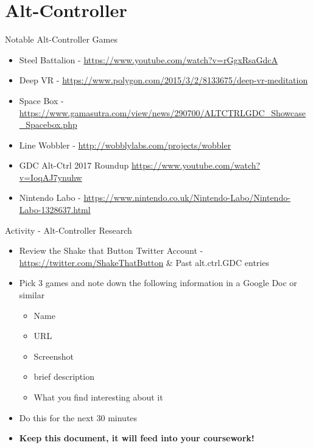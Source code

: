 \part{Alt-Controller}
\frame{\partpage}

\begin{frame}{Notable Alt-Controller Games}
\begin{itemize}
	\item Steel Battalion - \url{https://www.youtube.com/watch?v=rGgxRsaGdcA}
	\item Deep VR - \url{https://www.polygon.com/2015/3/2/8133675/deep-vr-meditation}
	\item Space Box - \url{https://www.gamasutra.com/view/news/290700/ALTCTRLGDC_Showcase_Spacebox.php}
	\item Line Wobbler - \url{http://wobblylabs.com/projects/wobbler}
	\item GDC Alt-Ctrl 2017 Roundup \url{https://www.youtube.com/watch?v=IoqAJ7ynuhw}
	\item Nintendo Labo - \url{https://www.nintendo.co.uk/Nintendo-Labo/Nintendo-Labo-1328637.html}
\end{itemize}
\end{frame}

\begin{frame}{Activity - Alt-Controller Research}
	\begin{itemize}
		\pause \item Review the Shake that Button Twitter Account - \url{https://twitter.com/ShakeThatButton} \& Past alt.ctrl.GDC entries
		\pause \item Pick 3 games and note down the following information in a Google Doc or similar
		\begin{itemize}
			\pause\item Name
			\item URL
			\item Screenshot
			\item brief description
			\item What you find interesting about it 
		\end{itemize}
		\pause \item Do this for the next 30 minutes
		\pause \item \textbf{Keep this document, it will feed into your coursework!}
	\end{itemize}
\end{frame}
